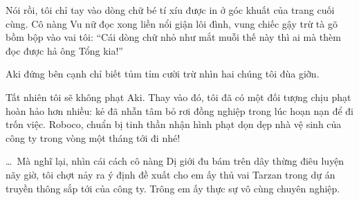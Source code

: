 \documentclass[../main.tex]{subfiles}
\begin{document}
Nói rồi, tôi chỉ tay vào dòng chữ bé tí xíu được in ở góc khuất của trang cuối cùng. Cô nàng Vu nữ đọc xong liền nổi giận lôi đình, vung chiếc gậy trừ tà gõ bồm bộp vào vai tôi: ``Cái dòng chữ nhỏ như mắt muỗi thế này thì ai mà thèm đọc được hả ông Tổng kia!''

Aki đứng bên cạnh chỉ biết tủm tỉm cười trừ nhìn hai chúng tôi đùa giỡn.

Tất nhiên tôi sẽ không phạt Aki. Thay vào đó, tôi đã có một đối tượng chịu phạt hoàn hảo hơn nhiều: kẻ đã nhẫn tâm bỏ rơi đồng nghiệp trong lúc hoạn nạn để đi trốn việc. Roboco, chuẩn bị tinh thần nhận hình phạt dọn dẹp nhà vệ sinh của công ty trong vòng một tháng tới đi nhé!

\dots\ Mà nghĩ lại, nhìn cái cách cô nàng Dị giới đu bám trên dây thừng điêu luyện nãy giờ, tôi chợt nảy ra ý định đề xuất cho em ấy thủ vai Tarzan trong dự án truyền thông sắp tới của công ty. Trông em ấy thực sự vô cùng chuyên nghiệp.

\end{document}
